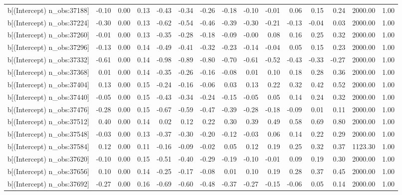 \begin{table}[ht]
\begin{tabular}{rrrrrrrrrrrrrrr}
  b[(Intercept) n\_obs:37188] & -0.10 & 0.00 & 0.13 & -0.43 & -0.34 & -0.26 & -0.18 & -0.10 & -0.01 & 0.06 & 0.15 & 0.24 & 2000.00 & 1.00 \\ 
  b[(Intercept) n\_obs:37224] & -0.30 & 0.00 & 0.13 & -0.62 & -0.54 & -0.46 & -0.39 & -0.30 & -0.21 & -0.13 & -0.04 & 0.03 & 2000.00 & 1.00 \\ 
  b[(Intercept) n\_obs:37260] & -0.01 & 0.00 & 0.13 & -0.35 & -0.28 & -0.18 & -0.09 & -0.00 & 0.08 & 0.16 & 0.25 & 0.32 & 2000.00 & 1.00 \\ 
  b[(Intercept) n\_obs:37296] & -0.13 & 0.00 & 0.14 & -0.49 & -0.41 & -0.32 & -0.23 & -0.14 & -0.04 & 0.05 & 0.15 & 0.23 & 2000.00 & 1.00 \\ 
  b[(Intercept) n\_obs:37332] & -0.61 & 0.00 & 0.14 & -0.98 & -0.89 & -0.80 & -0.70 & -0.61 & -0.52 & -0.43 & -0.33 & -0.27 & 2000.00 & 1.00 \\ 
  b[(Intercept) n\_obs:37368] & 0.01 & 0.00 & 0.14 & -0.35 & -0.26 & -0.16 & -0.08 & 0.01 & 0.10 & 0.18 & 0.28 & 0.36 & 2000.00 & 1.00 \\ 
  b[(Intercept) n\_obs:37404] & 0.13 & 0.00 & 0.15 & -0.24 & -0.16 & -0.06 & 0.03 & 0.13 & 0.22 & 0.32 & 0.42 & 0.52 & 2000.00 & 1.00 \\ 
  b[(Intercept) n\_obs:37440] & -0.05 & 0.00 & 0.15 & -0.43 & -0.34 & -0.24 & -0.15 & -0.05 & 0.05 & 0.14 & 0.24 & 0.32 & 2000.00 & 1.00 \\ 
  b[(Intercept) n\_obs:37476] & -0.28 & 0.00 & 0.15 & -0.67 & -0.59 & -0.47 & -0.39 & -0.28 & -0.18 & -0.09 & 0.01 & 0.11 & 2000.00 & 1.00 \\ 
  b[(Intercept) n\_obs:37512] & 0.40 & 0.00 & 0.14 & 0.02 & 0.12 & 0.22 & 0.30 & 0.39 & 0.49 & 0.58 & 0.69 & 0.80 & 2000.00 & 1.00 \\ 
  b[(Intercept) n\_obs:37548] & -0.03 & 0.00 & 0.13 & -0.37 & -0.30 & -0.20 & -0.12 & -0.03 & 0.06 & 0.14 & 0.22 & 0.29 & 2000.00 & 1.00 \\ 
  b[(Intercept) n\_obs:37584] & 0.12 & 0.00 & 0.11 & -0.16 & -0.09 & -0.02 & 0.05 & 0.12 & 0.19 & 0.25 & 0.32 & 0.37 & 1123.30 & 1.00 \\ 
  b[(Intercept) n\_obs:37620] & -0.10 & 0.00 & 0.15 & -0.51 & -0.40 & -0.29 & -0.19 & -0.10 & -0.01 & 0.09 & 0.19 & 0.30 & 2000.00 & 1.00 \\ 
  b[(Intercept) n\_obs:37656] & 0.10 & 0.00 & 0.14 & -0.25 & -0.17 & -0.08 & 0.01 & 0.10 & 0.19 & 0.28 & 0.37 & 0.45 & 2000.00 & 1.00 \\ 
  b[(Intercept) n\_obs:37692] & -0.27 & 0.00 & 0.16 & -0.69 & -0.60 & -0.48 & -0.37 & -0.27 & -0.15 & -0.06 & 0.05 & 0.14 & 2000.00 & 1.00 \\ 

\end{tabular}
\end{table}
